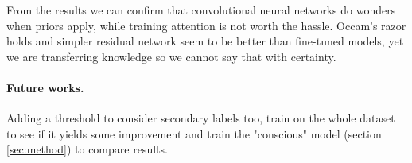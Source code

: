 \documentclass{article}
\begin{document}
From the results we can confirm that convolutional neural networks do wonders when priors apply, while training attention is not worth the hassle. 
Occam's razor holds and simpler residual network seem to be better than fine-tuned models, yet we are transferring knowledge so we cannot say that with certainty. 

\paragraph*{Future works.}
Adding a threshold to consider secondary labels too, train on the whole dataset to see if it yields some improvement and train the "conscious" model (section \ref{sec:method}) to compare results.



\end{document}
